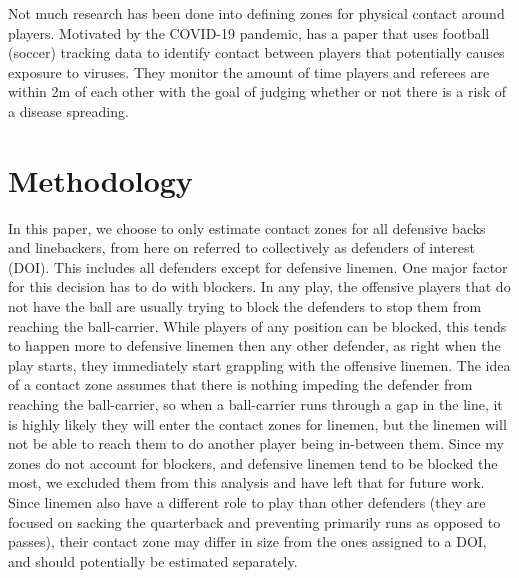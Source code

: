 \documentclass[
  12pt]{article}
\begin{document}
Not much research has been done into defining zones for physical contact
around players. Motivated by the COVID-19 pandemic, \citet{covid} has a
paper that uses football (soccer) tracking data to identify contact
between players that potentially causes exposure to viruses. They
monitor the amount of time players and referees are within 2m of each
other with the goal of judging whether or not there is a risk of a
disease spreading.

\section{Methodology}\label{methodology}

In this paper, we choose to only estimate contact zones for all
defensive backs and linebackers, from here on referred to collectively
as defenders of interest (DOI). This includes all defenders except for
defensive linemen. One major factor for this decision has to do with
blockers. In any play, the offensive players that do not have the ball
are usually trying to block the defenders to stop them from reaching the
ball-carrier. While players of any position can be blocked, this tends
to happen more to defensive linemen then any other defender, as right
when the play starts, they immediately start grappling with the
offensive linemen. The idea of a contact zone assumes that there is
nothing impeding the defender from reaching the ball-carrier, so when a
ball-carrier runs through a gap in the line, it is highly likely they
will enter the contact zones for linemen, but the linemen will not be
able to reach them to do another player being in-between them. Since my
zones do not account for blockers, and defensive linemen tend to be
blocked the most, we excluded them from this analysis and have left that
for future work. Since linemen also have a different role to play than
other defenders (they are focused on sacking the quarterback and
preventing primarily runs as opposed to passes), their contact zone may
differ in size from the ones assigned to a DOI, and should potentially
be estimated separately.
\end{document}

